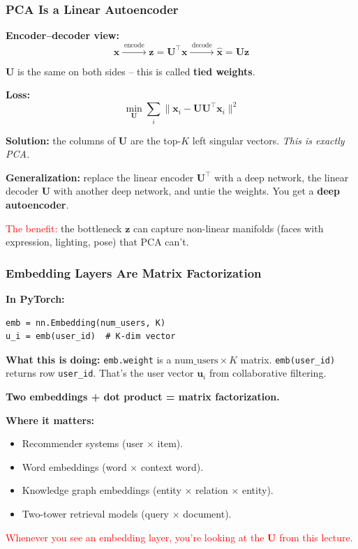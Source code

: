\documentclass[notes,11pt, aspectratio=169]{beamer}
\newcommand{\vx}{\mathbf{x}}
\newcommand{\vu}{\mathbf{u}}
\newcommand{\vz}{\mathbf{z}}
\newcommand{\vU}{\mathbf{U}}
\begin{document}
\begin{frame}
\frametitle{PCA Is a Linear Autoencoder}

\textbf{Encoder--decoder view:}
\[
    \vx \xrightarrow{\;\text{encode}\;} \vz = \vU^\top \vx \xrightarrow{\;\text{decode}\;} \hat{\vx} = \vU \vz
\]

\vspace{6pt}
$\vU$ is the same on both sides -- this is called \textbf{tied weights}.

\vspace{8pt}
\textbf{Loss:}
\[
    \min_{\vU} \sum_i \|\vx_i - \vU \vU^\top \vx_i\|^2
\]

\vspace{6pt}
\textbf{Solution:} the columns of $\vU$ are the top-$K$ left singular vectors. \emph{This is exactly PCA.}

\vspace{8pt}
\textbf{Generalization:} replace the linear encoder $\vU^\top$ with a deep network, the linear decoder $\vU$ with another deep network, and untie the weights. You get a \textbf{deep autoencoder}.

\vspace{4pt}
\textcolor{red}{The benefit:} the bottleneck $\vz$ can capture non-linear manifolds (faces with expression, lighting, pose) that PCA can't.
\end{frame}

\begin{frame}[fragile]
\frametitle{Embedding Layers Are Matrix Factorization}

\textbf{In PyTorch:}
\begin{lstlisting}
emb = nn.Embedding(num_users, K)
u_i = emb(user_id)  # K-dim vector
\end{lstlisting}

\vspace{6pt}
\textbf{What this is doing:} \texttt{emb.weight} is a $\text{num\_users} \times K$ matrix. \texttt{emb(user\_id)} returns row \texttt{user\_id}. That's the user vector $\vu_i$ from collaborative filtering.

\vspace{6pt}
\textbf{Two embeddings + dot product = matrix factorization.}

\vspace{8pt}
\textbf{Where it matters:}
\begin{itemize}
    \item Recommender systems (user $\times$ item).
    \item Word embeddings (word $\times$ context word).
    \item Knowledge graph embeddings (entity $\times$ relation $\times$ entity).
    \item Two-tower retrieval models (query $\times$ document).
\end{itemize}

\vspace{4pt}
\textcolor{red}{Whenever you see an embedding layer, you're looking at the $\vU$ from this lecture.}
\end{frame}
\end{document}
